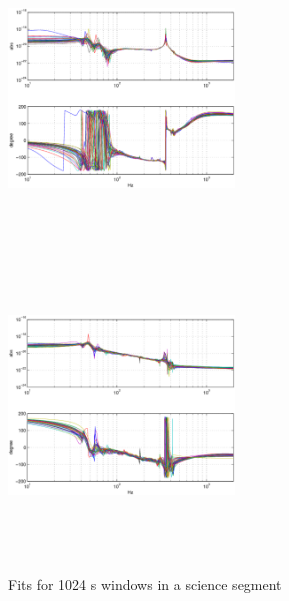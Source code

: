 \begin{figure}
\includegraphics[height=80mm, width=60mm]{clip-MICH-many.eps}
\includegraphics[height=80mm, width=60mm]{clip-PRC-many.eps}
\caption{Fits for 1024 s windows in a science segment}
\end{figure}

